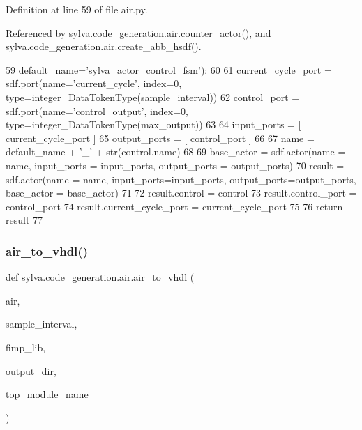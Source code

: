 Definition at line 59 of file air.\+py.



Referenced by sylva.\+code\+\_\+generation.\+air.\+counter\+\_\+actor(), and sylva.\+code\+\_\+generation.\+air.\+create\+\_\+abb\+\_\+hsdf().


\begin{DoxyCode}
59   default\_name=\textcolor{stringliteral}{'sylva\_actor\_control\_fsm'}):
60 
61   current\_cycle\_port = sdf.port(name=\textcolor{stringliteral}{'current\_cycle'}, index=0, type=integer\_DataTokenType(sample\_interval))
62   control\_port = sdf.port(name=\textcolor{stringliteral}{'control\_output'}, index=0, type=integer\_DataTokenType(max\_output))
63 
64   input\_ports = [ current\_cycle\_port ]
65   output\_ports = [ control\_port ]
66 
67   name = default\_name + \textcolor{stringliteral}{'\_'} + str(control.name)
68 
69   base\_actor = sdf.actor(name = name, input\_ports = input\_ports, output\_ports = output\_ports)
70   result = sdf.actor(name = name, input\_ports=input\_ports, output\_ports=output\_ports, base\_actor = 
      base\_actor)
71 
72   result.control = control
73   result.control\_port = control\_port
74   result.current\_cycle\_port = current\_cycle\_port
75 
76   \textcolor{keywordflow}{return} result
77 
\end{DoxyCode}
\mbox{\label{namespacesylva_1_1code__generation_1_1air_a12c49366c61395ad719575c8715849cc}} 
\subsubsection{\texorpdfstring{air\+\_\+to\+\_\+vhdl()}{air\_to\_vhdl()}}
{\footnotesize\ttfamily def sylva.\+code\+\_\+generation.\+air.\+air\+\_\+to\+\_\+vhdl (\begin{DoxyParamCaption}\item[{}]{air,  }\item[{}]{sample\+\_\+interval,  }\item[{}]{fimp\+\_\+lib,  }\item[{}]{output\+\_\+dir,  }\item[{}]{top\+\_\+module\+\_\+name }\end{DoxyParamCaption})}



